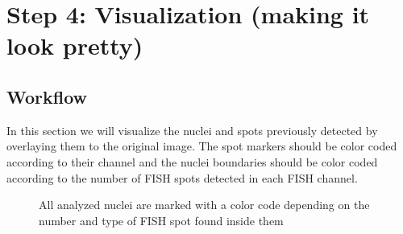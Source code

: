 \documentclass[11pt,a4paper,oneside]{report}
\begin{document}
\newpage
\section{Step 4: Visualization (making it look pretty)}
\subsection{Workflow}
In this section we will visualize the nuclei and spots previously detected by overlaying them to the original image. The spot markers should be color coded according to their channel and the nuclei boundaries should be color coded according to the number of FISH spots detected in each FISH channel.
\begin{figure}[htbp]
    \centering
     \caption{All analyzed nuclei are marked with a color code depending on the number and type of FISH spot found inside them}
     \label{fig:VisGoal}
\end{figure}
\end{document}
